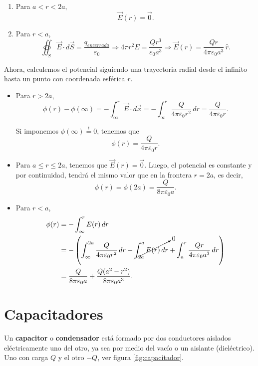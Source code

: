 \begin{ejemplo}
\begin{enumerate}
        \item Para $a < r < 2a$,
        $$\Vec{E}(r) = \Vec{0}.$$

        \item Para $r< a$,
        $$\oiint_S \Vec{E} \cdot d\Vec{S} = \frac{q_{encerrada}}{\varepsilon_0} \Rightarrow 4\pi r^2 E = \frac{Q r^3}{\varepsilon_0 a^3} \Rightarrow \Vec{E}(r) = \frac{Q r}{4\pi\varepsilon_0 a^3} \,\hat{r}.$$
    \end{enumerate}

    Ahora, calculemos el potencial siguiendo una trayectoria radial desde el infinito hasta un punto con coordenada esférica $r$.

    \begin{itemize}
        \item Para $r > 2a$,
        $$\phi(r) - \phi(\infty) = -\int_{\infty}^r \Vec{E} \cdot d\vec{x} = -\int_{\infty}^r \frac{Q}{4\pi\varepsilon_0 r^2} \,dr = \frac{Q}{4\pi\varepsilon_0 r}.$$

        Si imponemos $\phi(\infty) \stackrel{!}{=} 0$, tenemos que
        $$\phi(r) = \frac{Q}{4\pi\varepsilon_0 r}.$$

        \item Para $a \leq r \leq 2 a$, tenemos que $\Vec{E}(r) = \Vec{0}$. Luego, el potencial es constante y por continuidad, tendrá el mismo valor que en la frontera $r = 2a$, es decir,
        $$\phi(r) = \phi(2a) = \frac{Q}{8\pi\varepsilon_0 a}.$$

        \item Para $r < a$, 
        \begin{align*}
            \phi(r) &= - \int_{\infty}^r E(r) \,dr \\
            &= - \left( \int_{\infty}^{2a} \frac{Q}{4\pi\varepsilon_0 r^2} \,dr + \cancelto{0}{\int_{2a}^a E(r) \,dr} + \int_a^r  \frac{Qr}{4\pi \varepsilon_0 a^3} \,dr \right) \\
            &= \frac{Q}{8\pi \varepsilon_0 a} + \frac{Q(a^2-r^2)}{8\pi \varepsilon_0 a^3}.
        \end{align*}
    \end{itemize}
\end{ejemplo}

\section{Capacitadores}

Un \textbf{capacitor} o \textbf{condensador} está formado por dos conductores aislados eléctricamente uno del otro, ya sea por medio del vacío o un aislante (dieléctrico). Uno con carga $Q$ y el otro $-Q$, ver figura \ref{fig:capacitador}.

